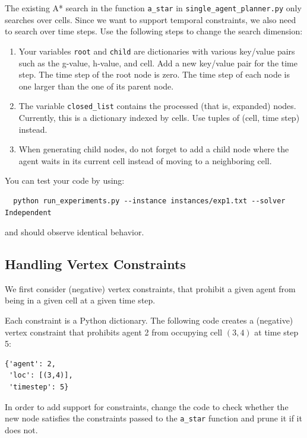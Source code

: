 \documentclass[11pt]{article}
\begin{document}
The existing A* search in the function \texttt{a_star} in \texttt{single\_agent\_planner.py} only searches over cells. Since we want to support temporal constraints, we also need to search over time steps. Use the following steps to change the search dimension:

\begin{enumerate}
    \item Your variables \texttt{root} and \texttt{child} are dictionaries with various key/value pairs such as the g-value, h-value, and cell. Add a new key/value pair for the time step. The time step of the root node is zero. The time step of each node is one larger than the one of its parent node.
    \item The variable \texttt{closed_list} contains the processed (that is, expanded) nodes. Currently, this is a dictionary indexed by cells. Use tuples of (cell, time step) instead.
    \item When generating child nodes, do not forget to add a child node where the agent waits in its current cell instead of moving to a neighboring cell.
\end{enumerate}

You can test your code by using:

\begin{verbatim}
  python run_experiments.py --instance instances/exp1.txt --solver Independent
\end{verbatim}

and should observe identical behavior.

\subsection{Handling Vertex Constraints}

We first consider (negative) vertex constraints, that prohibit a given agent from being in a given cell at a given time step.

Each constraint is a Python dictionary. The following code creates a (negative) vertex constraint that prohibits agent 2 from occupying cell $(3,4)$ at time step 5:

\begin{verbatim}
{'agent': 2,
 'loc': [(3,4)],
 'timestep': 5}
\end{verbatim}

In order to add support for constraints, change the code to check whether the new node satisfies the constraints passed to the \texttt{a_star} function and prune it if it does not.
\end{document}
